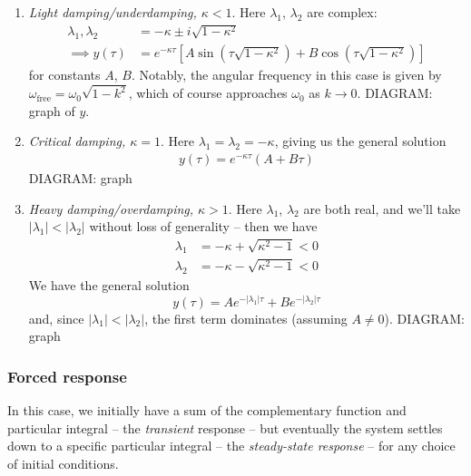 \documentclass{../../template/note}
\begin{document}
    \begin{enumerate}[label=\protect\circled{\arabic*}]
        \item \emph{Light damping/underdamping, \(\kappa < 1\)}. Here \(\lambda_1\), \(\lambda_2\) are complex:
        \begin{align*}
            \lambda_1, \lambda_2 &= -\kappa \pm i\sqrt{1-\kappa^2} \\
            \implies y(\tau) &= e^{-\kappa \tau}\left[A\sin\left(\tau\sqrt{1-\kappa^2}\right)+B \cos\left(\tau \sqrt{1-\kappa^2}\right)\right]
        \end{align*}
        for constants \(A\), \(B\). Notably, the angular frequency in this case is given by \(\omega_\text{free} = \omega_0 \sqrt{1-k^2}\), which of course approaches \(\omega_0\) as \(k \to 0\).
        DIAGRAM: graph of \(y\).
        \item \emph{Critical damping, \(\kappa = 1\)}. Here \(\lambda_1 = \lambda_2 = -\kappa\), giving us the general solution
        \begin{align*}
            y(\tau) = e^{-\kappa \tau}(A + B \tau)
        \end{align*}
        DIAGRAM: graph
        \item \emph{Heavy damping/overdamping, \(\kappa > 1\)}. Here \(\lambda_1\), \(\lambda_2\) are both real, and we'll take \(|\lambda_1| < |\lambda_2|\) without loss of generality -- then we have
        \begin{align*}
            \lambda_1 &= -\kappa + \sqrt{\kappa^2 - 1} < 0 \\
            \lambda_2 &= -\kappa - \sqrt{\kappa^2 - 1} < 0
        \end{align*}
        We have the general solution
        \[
            y(\tau) = Ae^{-|\lambda_1|\tau} + Be^{-|\lambda_2|\tau}
        \]
        and, since \(|\lambda_1| < |\lambda_2|\), the first term dominates (assuming \(A \neq 0\)).
        DIAGRAM: graph
        
    \end{enumerate}
    
    \subsubsection{Forced response}

    In this case, we initially have a sum of the complementary function and particular integral -- the \emph{transient} response -- but eventually the system settles down to a specific particular integral -- the \emph{steady-state response} -- for any choice of initial conditions.
\end{document}
